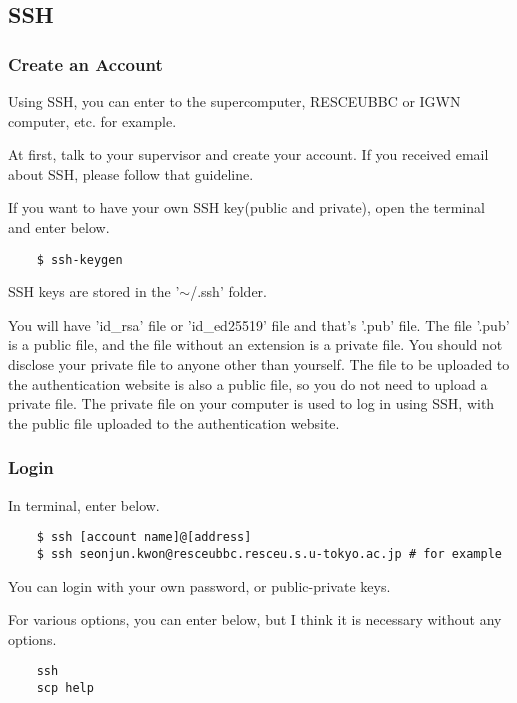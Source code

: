 \subsection{SSH}

\subsubsection{Create an Account}\label{SSH}

Using SSH, you can enter to the supercomputer, RESCEUBBC or IGWN computer, etc. for example.

At first, talk to your supervisor and create your account. If you received email about SSH, please follow that guideline.

If you want to have your own SSH key(public and private), open the terminal and enter below.

\begin{verbatim}
    $ ssh-keygen
\end{verbatim}

SSH keys are stored in the '$\sim$/.ssh' folder.

You will have 'id\_rsa' file or 'id\_ed25519' file and that's '.pub' file. The file '.pub' is a public file, and the file without an extension is a private file. You should not disclose your private file to anyone other than yourself. The file to be uploaded to the authentication website is also a public file, so you do not need to upload a private file. The private file on your computer is used to log in using SSH, with the public file uploaded to the authentication website.

\subsubsection{Login}

In terminal, enter below.

\begin{verbatim}
    $ ssh [account name]@[address]
    $ ssh seonjun.kwon@resceubbc.resceu.s.u-tokyo.ac.jp # for example
\end{verbatim}

You can login with your own password, or public-private keys.

For various options, you can enter below, but I think it is necessary without any options.

\begin{verbatim}
    ssh
    scp help
\end{verbatim}

